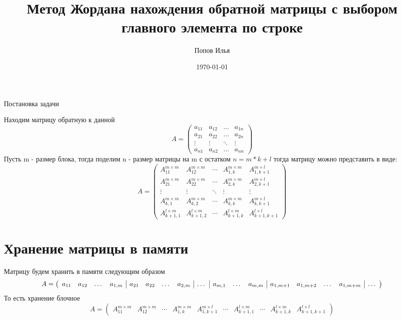 \documentclass[a4paper,12pt]{article}
\begin{document}
\author{Попов Илья}
\title{Метод Жордана нахождения обратной матрицы с выбором главного элемента по строке}
\date{\today}
\maketitle

\begin{center}
{Постановка задачи}
\end{center}

Находим матрицу обратную к данной
$$A=
   \begin{pmatrix}
     a_{11}& a_{12} &\ldots & a_{1n}\\
     a_{21}& a_{22} &\ldots & a_{2n}\\
     \vdots& \vdots &\ddots & \vdots\\
     a_{n1}& a_{n2} &\ldots & a_{nn}
    \end{pmatrix}
$$
Пусть m - размер блока, тогда поделим n - размер матрицы на m с остатком $n = m*k + l$ тогда матрицу
можно представить в виде:
$$A=
  \begin{pmatrix} 
    A_{11}^{m \times m} & A_{12}^{m \times m} & \cdots & A_{1,k}^{m \times m} & A_{1,k+1}^{m \times l} \\
    A_{21}^{m \times m} & A_{22}^{m \times m} & \cdots & A_{2,k}^{m \times m} & A_{2,k+1}^{m \times l} \\ 
    \vdots & \vdots & \ddots & \vdots & \vdots \\ 
    A_{k,1}^{m \times m} & A_{k,2}^{m \times m} & \cdots & A_{k,k}^{m \times m} & A_{k,k+1}^{m \times l} \\
    A_{k+1,1}^{l \times m} & A_{k+1,2}^{l \times m} & \cdots & A_{k+1,k}^{l \times m} & A_{k+1,k+1}^{l \times l} 
  \end{pmatrix}
$$

\section{Хранение матрицы в памяти}
Матрицу будем хранить в памяти следующим образом
$$
A = \left(
\begin{array}{c c c c | c c c c | c | c c c | c c c c | c}
    a_{11} & a_{12} & \dots & a_{1,m} & a_{21} & a_{22} & \dots & a_{2,m} & \dots & a_{m,1} &
    \dots & a_{m,m} & a_{1,m+1} & a_{1,m+2} & \dots & a_{1,m+m} & \dots
\end{array}
\right)
$$
То есть хранение блочное
$$A=
  \begin{pmatrix} 
      A_{11}^{m \times m} & A_{12}^{m \times m} & \cdots & A_{1,k}^{m \times m} &
      A_{1,k+1}^{m \times l} & \cdots & A_{k+1,1}^{l \times m} & \cdots & 
      A_{k+1,k}^{l \times m} & A_{k+1,k+1}^{l \times l} 
  \end{pmatrix}
$$
\end{document}
